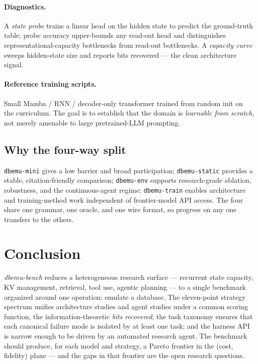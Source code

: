 \documentclass[11pt]{article}
\begin{document}
\paragraph{Diagnostics.}
A \emph{state probe} trains a linear head on the hidden state to
predict the ground-truth table; probe accuracy upper-bounds any
read-out head and distinguishes representational-capacity bottlenecks
from read-out bottlenecks. A \emph{capacity curve} sweeps hidden-state
size and reports bits recovered --- the clean architecture signal.

\paragraph{Reference training scripts.}
Small Mamba / RNN / decoder-only transformer trained from random init
on the curriculum. The goal is to establish that the domain is
\emph{learnable from scratch}, not merely amenable to large
pretrained-LLM prompting.

\subsection{Why the four-way split}

\texttt{dbemu-mini} gives a low barrier and broad participation;
\texttt{dbemu-static} provides a stable, citation-friendly comparison;
\texttt{dbemu-env} supports research-grade ablation, robustness, and
the continuous-agent regime; \texttt{dbemu-train} enables architecture
and training-method work independent of frontier-model API access. The
four share one grammar, one oracle, and one wire format, so progress
on any one transfers to the others.

\section{Conclusion}

\emph{dbemu-bench} reduces a heterogeneous research surface --- recurrent
state capacity, KV management, retrieval, tool use, agentic planning ---
to a single benchmark organized around one operation: emulate a database.
The eleven-point strategy spectrum unifies architecture studies and
agent studies under a common scoring function, the information-theoretic
\emph{bits recovered}; the task taxonomy ensures that each canonical
failure mode is isolated by at least one task; and the harness API is
narrow enough to be driven by an automated research agent. The benchmark
should produce, for each model and strategy, a Pareto frontier in the
(cost, fidelity) plane --- and the gaps in that frontier are the open
research questions.
\end{document}
